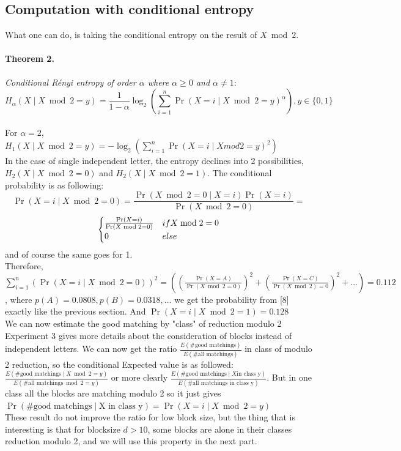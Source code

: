 \documentclass{article}
\begin{document}
\subsection{Computation with conditional entropy}
What one can do, is taking the conditional entropy on the result of $X \bmod 2$.\\
\paragraph{Theorem 2.}\textit{Conditional R\'enyi entropy of order $\alpha$ where $\alpha \geq 0$ and $\alpha \neq 1$}:
$$H_{\alpha}(X \mid X \bmod 2 = y) = \frac{1}{1-\alpha}\log_{2}(\sum_{i=1}^{n}{\Pr(X=i \mid X \bmod 2= y )^{\alpha}}), y \in \{0,1\} $$\\
For $\alpha = 2$, $H_{1}(X \mid X \bmod 2 = y) = -\log_{2}(\sum_{i=1}^{n}{\Pr (X=i \mid X mod2 = y)^{2}})$\\
In the case of single independent letter, the entropy declines into 2 possibilities, $H_{2}(X \mid X \bmod 2 = 0) $ and $H_{2}(X \mid X \bmod 2 = 1)$. The conditional probability is as following:
$$\Pr (X=i \mid X \bmod 2 = 0 ) = \frac{\Pr(X \bmod 2 = 0 \mid X = i) \Pr(X=i)}{\Pr(X \bmod 2 =0)} = $$
\[ \begin{cases}
      \frac{\Pr(X=i)}{\Pr(X \bmod 2 =0)} $$ & if X \bmod 2 =0  \\
      0 & else
   \end{cases}
\]
and of course the same goes for 1.\\

Therefore, $\sum_{i=1}^{n}{(\Pr (X=i \mid X \bmod 2 = 0))^{2}} = ((\frac{\Pr(X=A)}{\Pr(X \bmod 2 = 0)})^{2} + (\frac{\Pr(X=C)}{\Pr(X \bmod 2) = 0})^{2} +... )= 0.112$, where $p(A)=0.0808, p(B)=0.0318,...$  we get the probability from [8] exactly like the previous section.
And $\Pr(X=i \mid X \bmod 2 = 1) = 0.128$\\
We can now estimate the good matching by "class" of reduction modulo 2
Experiment 3 gives more details about the consideration of blocks instead of independent letters.
We can now get the ratio $\frac{E(\# \text{good matchings})}{E(\# \text{all matchings})}$ in class of modulo 2 reduction, so the conditional Expected value is as followed: $\frac{E(\# \text{good matchings} \mid X \bmod 2 = y)}{E(\# \text{all matchings} \bmod 2 = y)}$ or more clearly $\frac{E(\# \text{good matchings} \mid X \text{in class y})}{E(\# \text{all matchings in class y})}$. But in one class all the blocks are matching modulo 2 so it just gives $\Pr(\# \text{good matchings} \mid \text{X in class y})  = \Pr (X=i \mid X \bmod 2 = y) $\\
These result do not improve the ratio for low block size, but the thing that is interesting is that for blocksize $d>10$, some blocks are alone in their classes reduction modulo 2, and we will use this property in the next part.
\end{document}
